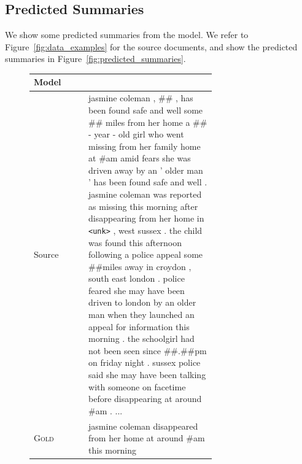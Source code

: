 \documentclass[12pt]{report}
\begin{document}
\subsection{Predicted Summaries}
We show some predicted summaries from the model. We refer to Figure~\ref{fig:data_examples} for the source documents, and show the predicted summaries in Figure~\ref{fig:predicted_summaries}.

\begin{figure}[p]
\centering
\begin{tabular}{ll p{0.7\linewidth}}
\toprule
Model & & \\
\midrule
Source & & jasmine coleman , \#\# , has been found safe and well some \#\# miles from her home a \#\# - year - old girl who went missing from her family home at \#am amid fears she was driven away by an ' older man ' has been found safe and well . jasmine coleman was reported as missing this morning after disappearing from her home in \texttt{<unk>} , west sussex . the child was found this afternoon following a police appeal some \#\#miles away in croydon , south east london . police feared she may have been driven to london by an older man when they launched an appeal for information this morning . the schoolgirl had not been seen since \#\#.\#\#pm on friday night . sussex police said she may have been talking with someone on facetime before disappearing at around \#am . ... \\
\midrule
\textsc{Gold} & & jasmine coleman disappeared from her home at around \#am this morning \\

\end{tabular}
\end{figure}
\end{document}
